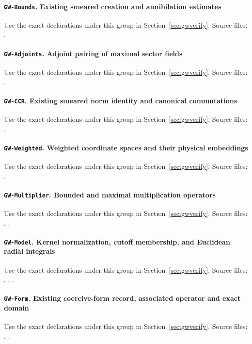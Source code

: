 \documentclass[11pt,a4paper]{article}
\theoremstyle{remark}\newtheorem{remark}[theorem]{Remark}
\begin{document}
\paragraph{\texttt{GW-Bounds}. Existing smeared creation and annihilation estimates}\label{leaf:GW-Bounds}
Use the exact declarations under this group in Section~\ref{sec:gwverify}. Source files: .
\paragraph{\texttt{GW-Adjoints}. Adjoint pairing of maximal sector fields}\label{leaf:GW-Adjoints}
Use the exact declarations under this group in Section~\ref{sec:gwverify}. Source files: .
\paragraph{\texttt{GW-CCR}. Existing smeared norm identity and canonical commutations}\label{leaf:GW-CCR}
Use the exact declarations under this group in Section~\ref{sec:gwverify}. Source files: .
\paragraph{\texttt{GW-Weighted}. Weighted coordinate spaces and their physical embeddings}\label{leaf:GW-Weighted}
Use the exact declarations under this group in Section~\ref{sec:gwverify}. Source files: .
\paragraph{\texttt{GW-Multiplier}. Bounded and maximal multiplication operators}\label{leaf:GW-Multiplier}
Use the exact declarations under this group in Section~\ref{sec:gwverify}. Source files: , .
\paragraph{\texttt{GW-Model}. Kernel normalization, cutoff membership, and Euclidean radial integrals}\label{leaf:GW-Model}
Use the exact declarations under this group in Section~\ref{sec:gwverify}. Source files: , , .
\paragraph{\texttt{GW-Form}. Existing coercive-form record, associated operator and exact domain}\label{leaf:GW-Form}
Use the exact declarations under this group in Section~\ref{sec:gwverify}. Source files: , .
\end{document}
